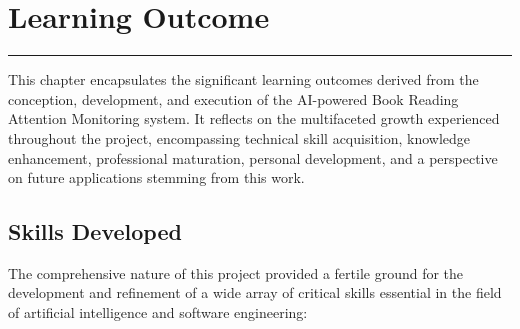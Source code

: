 \chapter{Learning Outcome} %
\vspace{-1.5cm}
\hspace{-1cm}\rule{19cm}{0.4pt} 


This chapter encapsulates the significant learning outcomes derived from the conception, development, and execution of the AI-powered Book Reading Attention Monitoring system. It reflects on the multifaceted growth experienced throughout the project, encompassing technical skill acquisition, knowledge enhancement, professional maturation, personal development, and a perspective on future applications stemming from this work.

\section{Skills Developed}
The comprehensive nature of this project provided a fertile ground for the development and refinement of a wide array of critical skills essential in the field of artificial intelligence and software engineering:

